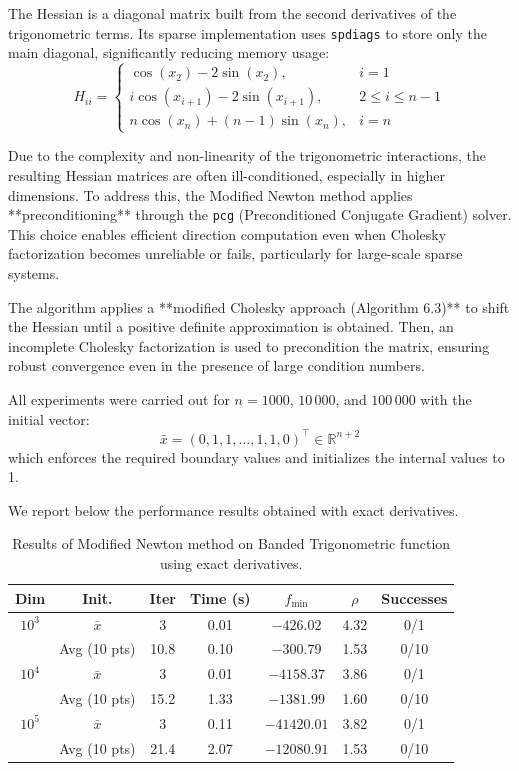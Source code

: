 \documentclass[a4paper,12pt]{article}
\begin{document}
	The Hessian is a diagonal matrix built from the second derivatives of the trigonometric terms. Its sparse implementation uses \verb|spdiags| to store only the main diagonal, significantly reducing memory usage:
	\[
	H_{ii} = 
	\begin{cases}
		\cos(x_{2}) - 2\sin(x_{2}), & i = 1 \\
		i\cos(x_{i+1}) - 2\sin(x_{i+1}), & 2 \le i \le n-1 \\
		n\cos(x_n) + (n-1)\sin(x_n), & i = n
	\end{cases}
	\]
	
	\medskip
	
	Due to the complexity and non-linearity of the trigonometric interactions, the resulting Hessian matrices are often ill-conditioned, especially in higher dimensions. To address this, the Modified Newton method applies **preconditioning** through the \texttt{pcg} (Preconditioned Conjugate Gradient) solver. This choice enables efficient direction computation even when Cholesky factorization becomes unreliable or fails, particularly for large-scale sparse systems.
	
	The algorithm applies a **modified Cholesky approach (Algorithm 6.3)** to shift the Hessian until a positive definite approximation is obtained. Then, an incomplete Cholesky factorization is used to precondition the matrix, ensuring robust convergence even in the presence of large condition numbers.
	
	All experiments were carried out for \(n = 1000\), \(10\,000\), and \(100\,000\) with the initial vector:
	\[
	\bar{x} = (0, 1, 1, \dots, 1, 1, 0)^\top \in \mathbb{R}^{n+2}
	\]
	which enforces the required boundary values and initializes the internal values to 1.
	
	We report below the performance results obtained with exact derivatives.
	
	\begin{table}[htbp]
		\centering
		\caption{Results of Modified Newton method on Banded Trigonometric function using exact derivatives.}
		\renewcommand{\arraystretch}{1.2}
		\begin{tabular}{|c|c|c|c|c|c|c|}
			\hline
			\textbf{Dim} & \textbf{Init.} & \textbf{Iter} & \textbf{Time (s)} & \textbf{$f_{\min}$} & \textbf{$\rho$} & \textbf{Successes} \\
			\hline
			$10^3$   & $\bar{x}$        & 3    & 0.01 & $-426.02$     & 4.32 & 0/1 \\
			& Avg (10 pts)     & 10.8 & 0.10 & $-300.79$     & 1.53 & 0/10 \\
			\hline
			$10^4$   & $\bar{x}$        & 3    & 0.01 & $-4158.37$    & 3.86 & 0/1 \\
			& Avg (10 pts)     & 15.2 & 1.33 & $-1381.99$    & 1.60 & 0/10 \\
			\hline
			$10^5$   & $\bar{x}$        & 3    & 0.11 & $-41420.01$   & 3.82 & 0/1 \\
			& Avg (10 pts)     & 21.4 & 2.07 & $-12080.91$   & 1.53 & 0/10 \\
			\hline
		\end{tabular}
		\label{tab:banded_exact}
	\end{table}
	
\end{document}
